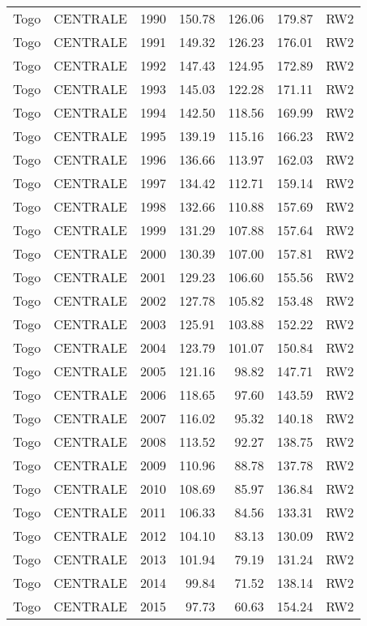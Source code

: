\begin{longtable}{lllrrrl}
  Togo & CENTRALE & 1990 & 150.78 & 126.06 & 179.87 & RW2 \\ 
  Togo & CENTRALE & 1991 & 149.32 & 126.23 & 176.01 & RW2 \\ 
  Togo & CENTRALE & 1992 & 147.43 & 124.95 & 172.89 & RW2 \\ 
  Togo & CENTRALE & 1993 & 145.03 & 122.28 & 171.11 & RW2 \\ 
  Togo & CENTRALE & 1994 & 142.50 & 118.56 & 169.99 & RW2 \\ 
  Togo & CENTRALE & 1995 & 139.19 & 115.16 & 166.23 & RW2 \\ 
  Togo & CENTRALE & 1996 & 136.66 & 113.97 & 162.03 & RW2 \\ 
  Togo & CENTRALE & 1997 & 134.42 & 112.71 & 159.14 & RW2 \\ 
  Togo & CENTRALE & 1998 & 132.66 & 110.88 & 157.69 & RW2 \\ 
  Togo & CENTRALE & 1999 & 131.29 & 107.88 & 157.64 & RW2 \\ 
  Togo & CENTRALE & 2000 & 130.39 & 107.00 & 157.81 & RW2 \\ 
  Togo & CENTRALE & 2001 & 129.23 & 106.60 & 155.56 & RW2 \\ 
  Togo & CENTRALE & 2002 & 127.78 & 105.82 & 153.48 & RW2 \\ 
  Togo & CENTRALE & 2003 & 125.91 & 103.88 & 152.22 & RW2 \\ 
  Togo & CENTRALE & 2004 & 123.79 & 101.07 & 150.84 & RW2 \\ 
  Togo & CENTRALE & 2005 & 121.16 & 98.82 & 147.71 & RW2 \\ 
  Togo & CENTRALE & 2006 & 118.65 & 97.60 & 143.59 & RW2 \\ 
  Togo & CENTRALE & 2007 & 116.02 & 95.32 & 140.18 & RW2 \\ 
  Togo & CENTRALE & 2008 & 113.52 & 92.27 & 138.75 & RW2 \\ 
  Togo & CENTRALE & 2009 & 110.96 & 88.78 & 137.78 & RW2 \\ 
  Togo & CENTRALE & 2010 & 108.69 & 85.97 & 136.84 & RW2 \\ 
  Togo & CENTRALE & 2011 & 106.33 & 84.56 & 133.31 & RW2 \\ 
  Togo & CENTRALE & 2012 & 104.10 & 83.13 & 130.09 & RW2 \\ 
  Togo & CENTRALE & 2013 & 101.94 & 79.19 & 131.24 & RW2 \\ 
  Togo & CENTRALE & 2014 & 99.84 & 71.52 & 138.14 & RW2 \\ 
  Togo & CENTRALE & 2015 & 97.73 & 60.63 & 154.24 & RW2 \\ 

\end{longtable}
